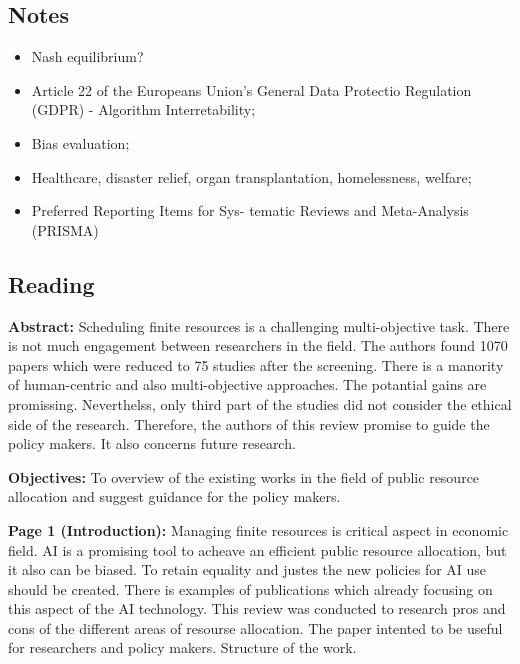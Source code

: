 \subsection{Notes}
    \begin{itemize}
        \item Nash equilibrium?
        \item Article 22 of the Europeans Union's General Data Protectio Regulation (GDPR) - Algorithm Interretability;
        \item Bias evaluation;
        \item Healthcare, disaster relief, organ transplantation, homelessness, welfare;
        \item Preferred Reporting Items for Sys- tematic Reviews and Meta-Analysis (PRISMA)
    \end{itemize}


\subsection{Reading}
    \textbf{Abstract:}
    Scheduling finite resources is a challenging multi-objective task. There is not much engagement between researchers in the field. The authors found 1070 papers which were reduced to 75 studies after the screening. There is a manority of human-centric and also multi-objective approaches. The potantial gains are promissing. Neverthelss, only third part of the studies did not consider the ethical side of the research. Therefore, the authors of this review promise to guide the policy makers. It also concerns future research. 
    
    \textbf{Objectives:}
    To overview of the existing works in the field of public resource allocation and suggest guidance for the policy makers.

    
    \textbf{Page 1 (Introduction):}
    Managing finite resources is critical aspect in economic field. AI is a promising tool to acheave an efficient public resource allocation, but it also can be biased. To retain equality and justes the new policies for AI use should be created. There is examples of publications which already focusing on this aspect of the AI technology. This review was conducted to research pros and cons of the different areas of resourse allocation. The paper intented to be useful for researchers and policy makers. Structure of the work. 
    

